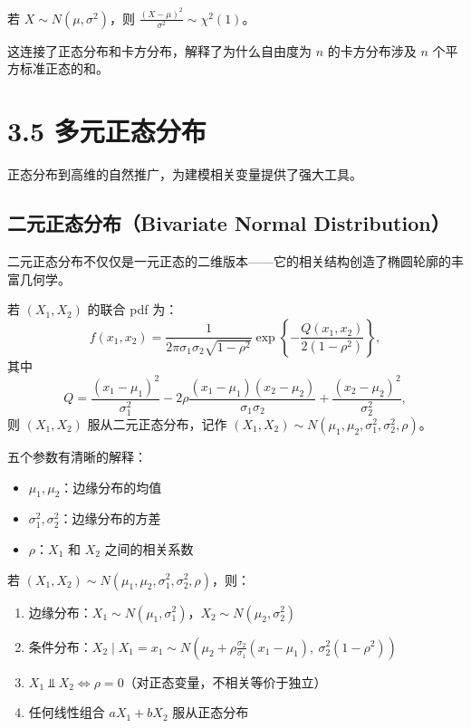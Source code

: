 \begin{example}[正态平方到卡方]\label{th:normal-to-chi-square-ch3}
若 $X \sim N(\mu, \sigma^{2})$，则 $\frac{(X-\mu)^{2}}{\sigma^{2}} \sim \chi^{2}(1)$。
\end{example}

这连接了正态分布和卡方分布，解释了为什么自由度为 $n$ 的卡方分布涉及 $n$ 个平方标准正态的和。

\section{3.5 多元正态分布}\label{sec:multivariate-normal-ch3}

正态分布到高维的自然推广，为建模相关变量提供了强大工具。

\subsection{二元正态分布（Bivariate Normal Distribution）}\label{sub:bivariate-normal-ch3}

二元正态分布不仅仅是一元正态的二维版本——它的相关结构创造了椭圆轮廓的丰富几何学。

\begin{definition}[二元正态分布]\label{def:bivariate-normal-ch3}
若 $(X_1, X_2)$ 的联合 pdf 为：
\[
f(x_1, x_2) = \frac{1}{2\pi\sigma_1\sigma_2\sqrt{1-\rho^{2}}} \exp\left\{ -\frac{Q(x_1, x_2)}{2(1-\rho^{2})} \right\},
\label{eq:bivariate-normal-pdf-ch3}
\]
其中
\[
Q = \frac{(x_1-\mu_1)^{2}}{\sigma_1^{2}} - 2\rho\frac{(x_1-\mu_1)(x_2-\mu_2)}{\sigma_1\sigma_2} + \frac{(x_2-\mu_2)^{2}}{\sigma_2^{2}},
\]
则 $(X_1, X_2)$ 服从二元正态分布，记作 $(X_1, X_2) \sim N(\mu_1, \mu_2, \sigma_1^{2}, \sigma_2^{2}, \rho)$。
\end{definition}

五个参数有清晰的解释：
\begin{itemize}
\item $\mu_1, \mu_2$：边缘分布的均值
\item $\sigma_1^{2}, \sigma_2^{2}$：边缘分布的方差
\item $\rho$：$X_1$ 和 $X_2$ 之间的相关系数
\end{itemize}

\begin{theorem}[二元正态分布的性质]\label{th:bivariate-normal-properties-ch3}
若 $(X_1, X_2) \sim N(\mu_1, \mu_2, \sigma_1^{2}, \sigma_2^{2}, \rho)$，则：
\begin{enumerate}
\item 边缘分布：$X_1 \sim N(\mu_1, \sigma_1^{2})$，$X_2 \sim N(\mu_2, \sigma_2^{2})$
\item 条件分布：$X_2 \mid X_1 = x_1 \sim N\left(\mu_2 + \rho\frac{\sigma_2}{\sigma_1}(x_1-\mu_1), \ \sigma_2^{2}(1-\rho^{2})\right)$
\item $X_1 \Perp X_2 \iff \rho = 0$（对正态变量，不相关等价于独立）
\item 任何线性组合 $aX_1 + bX_2$ 服从正态分布
\end{enumerate}
\end{theorem}

